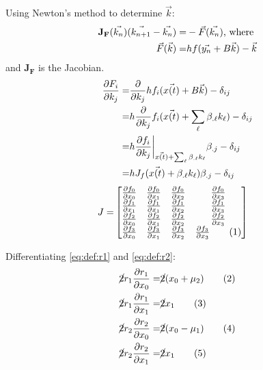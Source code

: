 \documentclass[]{article}
\newcommand\numberthis{\addtocounter{equation}{1}\tag{\theequation}}
\begin{document}
Using Newton's method\cite{enwiki:1380778120} to determine $\vec{k}$: 
\begin{align*}
	\mathbf{J_F}(\vec{k_n})(\vec{k_{n+1}}-\vec{k_n}) =& -\vec{F}(\vec{k_n}) \text{, where}\\
	\vec{F}(\vec{k}) =& hf(\vec{y_n} + \boldmath{B} \vec{k}) -	\vec{k}
\end{align*}
and $\mathbf{J_F}$ is the Jacobian.
\begin{align*}
	\frac{\partial F_i}{\partial k_j} =& \frac{\partial}{\partial k_j}hf_i(\vec{x(t)} + \boldmath{B} \vec{k}) -\delta_{ij}\\
	=& h \frac{\partial}{\partial k_j} f_i(\vec{x(t)} + \sum_{\ell} \beta_{.\ell} k_{\ell}) -\delta_{ij}\\
	=& h \frac{\partial f_i}{\partial k_j}\bigg|_{\vec{x(t)} + \sum_{\ell} \beta_{.\ell} k_{\ell}}\beta_{.j} - \delta_{ij}\\
	=& h J_f(\vec{x(t)} + \beta_{.\ell} k_{\ell})\beta_{.j} - \delta_{ij}
\end{align*}
\begin{align*}
	J =& \begin{bmatrix}
		\frac{\partial f_0}{\partial x_0}&\frac{\partial f_0}{\partial x_1}&\frac{\partial f_0}{\partial x_2}&\frac{\partial f_0}{\partial x_3}\\
		\frac{\partial f_1}{\partial x_1}&\frac{\partial f_1}{\partial x_1}&\frac{\partial f_1}{\partial x_2}&\frac{\partial f_1}{\partial x_3}\\
		\frac{\partial f_2}{\partial x_0}&\frac{\partial f_2}{\partial x_1}&\frac{\partial f_2}{\partial x_2}&\frac{\partial f_2}{\partial x_3}\\
		\frac{\partial f_3}{\partial x_0}&\frac{\partial f_3}{\partial x_1}&\frac{\partial f_3}{\partial x_2}&\frac{\partial f_3}{\partial x_3} \numberthis \label{eq:Jacobian}
	\end{bmatrix}
\end{align*}

Differentiating \eqref{eq:def:r1} and \eqref{eq:def:r2}:  
\begin{align*}
	\cancel{2}r_1\frac{\partial r_1}{\partial x_0} =& \cancel{2}(x_0+\mu_2) \numberthis \label{eq:dr1:dx0}\\
	\cancel{2}r_1\frac{\partial r_1}{\partial x_1} =& \cancel{2} x_1 \numberthis \label{eq:dr1:dx1}\\
	\cancel{2}r_2\frac{\partial r_2}{\partial x_0} =& \cancel{2}(x_0-\mu_1) \numberthis \label{eq:dr2:dx0}\\
	\cancel{2}r_2\frac{\partial r_2}{\partial x_1} =& \cancel{2} x_1\numberthis \label{eq:dr2:dx1}
\end{align*}
\end{document}
